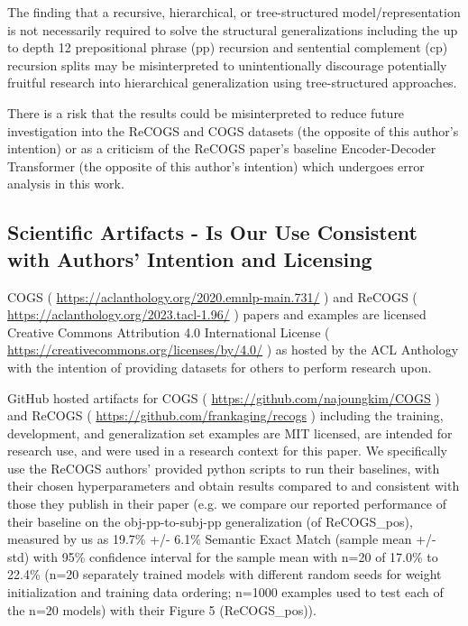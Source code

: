 \documentclass[11pt]{article}
\begin{document}
The finding that a recursive, hierarchical, or tree-structured model/representation is not necessarily required to solve the structural generalizations including the up to depth 12 prepositional phrase (pp) recursion and sentential complement (cp) recursion splits may be misinterpreted to unintentionally discourage potentially fruitful research into hierarchical generalization using tree-structured approaches.

There is a risk that the results could be misinterpreted to reduce future investigation into the ReCOGS and COGS datasets (the opposite of this author’s intention) or as a criticism of the ReCOGS paper's baseline Encoder-Decoder Transformer (the opposite of this author's intention) which undergoes error analysis in this work.

\subsection{Scientific Artifacts - Is Our Use Consistent with Authors' Intention and Licensing}
\label{scientific_artifacts_use}

COGS \citep{KimLinzen2020} ( \href{https://aclanthology.org/2020.emnlp-main.731/}{https://aclanthology.org/2020.emnlp-main.731/} ) and ReCOGS \citep{Wu2023} ( \href{https://aclanthology.org/2023.tacl-1.96/}{https://aclanthology.org/2023.tacl-1.96/} ) papers and examples are licensed Creative Commons Attribution 4.0 International License ( \href{https://creativecommons.org/licenses/by/4.0/}{https://creativecommons.org/licenses/by/4.0/} ) as hosted by the ACL Anthology with the intention of providing datasets for others to perform research upon. 

GitHub hosted artifacts for COGS ( \href{https://github.com/najoungkim/COGS}{https://github.com/najoungkim/COGS}  ) and ReCOGS ( \href{https://github.com/frankaging/recogs}{https://github.com/frankaging/recogs} ) including the training, development, and generalization set examples are MIT licensed, are intended for research use, and were used in a research context for this paper. We specifically use the ReCOGS authors' provided python scripts to run their baselines, with their chosen hyperparameters and obtain results compared to and consistent with those they publish in their paper (e.g. we compare our reported performance of their baseline on the obj-pp-to-subj-pp generalization (of ReCOGS\_pos), measured by us as 19.7\% +/- 6.1\% Semantic Exact Match (sample mean +/- std) with 95\% confidence interval for the sample mean with n=20 of 17.0\% to 22.4\% (n=20 separately trained models with different random seeds for weight initialization and training data ordering; n=1000 examples used to test each of the n=20 models) with their Figure 5 (ReCOGS\_pos)).
\end{document}

